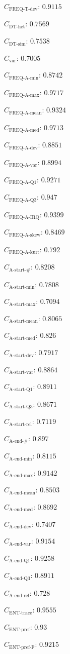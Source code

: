 \documentclass[a4paper]{article}
\newcommand{\varietyname}{\text{var}}
\newcommand{\variety}{C_{\varietyname}}
\newcommand{\startactivitiesname}{\text{A-start-\#}}
\newcommand{\startactivities}{C_{\startactivitiesname}}
\newcommand{\startactivitiesrelname}{\text{A-start-rel}}
\newcommand{\startactivitiesrel}{C_{\startactivitiesrelname}}
\newcommand{\startminname}{\text{A-start-min}}
\newcommand{\startmin}{C_{\startminname}}
\newcommand{\startmaxname}{\text{A-start-max}}
\newcommand{\startmax}{C_{\startmaxname}}
\newcommand{\startmeanname}{\text{A-start-mean}}
\newcommand{\startmean}{C_{\startmeanname}}
\newcommand{\startmedianname}{\text{A-start-med}}
\newcommand{\startmedian}{C_{\startmedianname}}
\newcommand{\startdevname}{\text{A-start-dev}}
\newcommand{\startdev}{C_{\startdevname}}
\newcommand{\startvarname}{\text{A-start-var}}
\newcommand{\startvar}{C_{\startvarname}}
\newcommand{\startqonename}{\text{A-start-Q1}}
\newcommand{\startqone}{C_{\startqonename}}
\newcommand{\startqthreename}{\text{A-start-Q3}}
\newcommand{\startqthree}{C_{\startqthreename}}
\newcommand{\lastactivitiesname}{\text{A-end-\#}}
\newcommand{\lastactivities}{C_{\lastactivitiesname}}
\newcommand{\lastactivitiesrelname}{\text{A-end-rel}}
\newcommand{\lastactivitiesrel}{C_{\lastactivitiesrelname}}
\newcommand{\lastminname}{\text{A-end-min}}
\newcommand{\lastmin}{C_{\lastminname}}
\newcommand{\lastmaxname}{\text{A-end-max}}
\newcommand{\lastmax}{C_{\lastmaxname}}
\newcommand{\lastmeanname}{\text{A-end-mean}}
\newcommand{\lastmean}{C_{\lastmeanname}}
\newcommand{\lastmedianname}{\text{A-end-med}}
\newcommand{\lastmedian}{C_{\lastmedianname}}
\newcommand{\lastdevname}{\text{A-end-dev}}
\newcommand{\lastdev}{C_{\lastdevname}}
\newcommand{\lastvarname}{\text{A-end-var}}
\newcommand{\lastvar}{C_{\lastvarname}}
\newcommand{\lastqonename}{\text{A-end-Q1}}
\newcommand{\lastqone}{C_{\lastqonename}}
\newcommand{\lastqthreename}{\text{A-end-Q3}}
\newcommand{\lastqthree}{C_{\lastqthreename}}
\newcommand{\freqdevname}{\text{FREQ-T-dev}}
\newcommand{\freqdev}{C_{\freqdevname}}
\newcommand{\actfreqminname}{\text{FREQ-A-min}}
\newcommand{\actfreqmin}{C_{\actfreqminname}}
\newcommand{\actfreqmaxname}{\text{FREQ-A-max}}
\newcommand{\actfreqmax}{C_{\actfreqmaxname}}
\newcommand{\actfreqmeanname}{\text{FREQ-A-mean}}
\newcommand{\actfreqmean}{C_{\actfreqmeanname}}
\newcommand{\actfreqmedianname}{\text{FREQ-A-med}}
\newcommand{\actfreqmedian}{C_{\actfreqmedianname}}
\newcommand{\actfreqdevname}{\text{FREQ-A-dev}}
\newcommand{\actfreqdev}{C_{\actfreqdevname}}
\newcommand{\actfreqvarname}{\text{FREQ-A-var}}
\newcommand{\actfreqvar}{C_{\actfreqvarname}}
\newcommand{\actfreqqonename}{\text{FREQ-A-Q1}}
\newcommand{\actfreqqone}{C_{\actfreqqonename}}
\newcommand{\actfreqqthreename}{\text{FREQ-A-Q3}}
\newcommand{\actfreqqthree}{C_{\actfreqqthreename}}
\newcommand{\actfreqiqrname}{\text{FREQ-A-IRQ}}
\newcommand{\actfreqiqr}{C_{\actfreqiqrname}}
\newcommand{\actfreqskewname}{\text{FREQ-A-skew}}
\newcommand{\actfreqskew}{C_{\actfreqskewname}}
\newcommand{\actfreqkurtname}{\text{FREQ-A-kurt}}
\newcommand{\actfreqkurt}{C_{\actfreqkurtname}}
\newcommand{\dthetname}{\text{DT-het}}
\newcommand{\dthet}{C_{\dthetname}}
\newcommand{\dtsimname}{\text{DT-sim}}
\newcommand{\dtsim}{C_{\dtsimname}}
\newcommand{\enttracename}{\text{ENT-trace}}
\newcommand{\enttrace}{C_{\enttracename}}
\newcommand{\entprefixname}{\text{ENT-pref}}
\newcommand{\entprefix}{C_{\entprefixname}}
\newcommand{\entprefixflatname}{\text{ENT-pref-F}}
\newcommand{\entprefixflat}{C_{\entprefixflatname}}
\begin{document}
\begin{compactitem}
\item $\freqdev$: $0.9115$
\item $\dthet$: $0.7569$
\item $\dtsim$: $0.7538$
\item $\variety$: $0.7005$
\item $\actfreqmin$: $0.8742$
\item $\actfreqmax$: $0.9717$
\item $\actfreqmean$: $0.9324$
\item $\actfreqmedian$: $0.9713$
\item $\actfreqdev$: $0.8851$
\item $\actfreqvar$: $0.8994$
\item $\actfreqqone$: $0.9271$
\item $\actfreqqthree$: $0.947$
\item $\actfreqiqr$: $0.9399$
\item $\actfreqskew$: $0.8469$
\item $\actfreqkurt$: $0.792$
\item $\startactivities$: $0.8208$
\item $\startmin$: $0.7808$
\item $\startmax$: $0.7094$
\item $\startmean$: $0.8065$
\item $\startmedian$: $0.826$
\item $\startdev$: $0.7917$
\item $\startvar$: $0.8864$
\item $\startqone$: $0.8911$
\item $\startqthree$: $0.8671$
\item $\startactivitiesrel$: $0.7119$
\item $\lastactivities$: $0.897$
\item $\lastmin$: $0.8115$
\item $\lastmax$: $0.9142$
\item $\lastmean$: $0.8503$
\item $\lastmedian$: $0.8692$
\item $\lastdev$: $0.7407$
\item $\lastvar$: $0.9154$
\item $\lastqone$: $0.9258$
\item $\lastqthree$: $0.8911$
\item $\lastactivitiesrel$: $0.728$
\item $\enttrace$: $0.9555$
\item $\entprefix$: $0.93$
\item $\entprefixflat$: $0.9215$

\end{compactitem}
\end{document}
